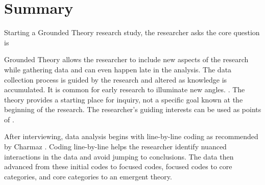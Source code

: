 \section{Summary}
Starting a Grounded Theory research study, the researcher asks the core question is   \cite{GlaserTheoreticalSensitivity}

Grounded Theory allows the researcher to include new aspects of the research while gathering data and can even happen late in the analysis. The data collection process is guided by the research and altered as knowledge is accumulated. It is common for early research to illuminate new angles.  \cite{Charmaz}. The theory provides a starting place for inquiry, not a specific goal known at the beginning of the research. The researcher's guiding interests can be used as points of   \cite{Charmaz}.

After interviewing, data analysis begins with line-by-line coding as recommended by Charmaz \cite{Charmaz}. Coding line-by-line helps the researcher identify nuanced interactions in the data and avoid jumping to conclusions. The data then advanced from these initial codes to focused codes, focused codes to core categories, and core categories to an emergent theory. 



